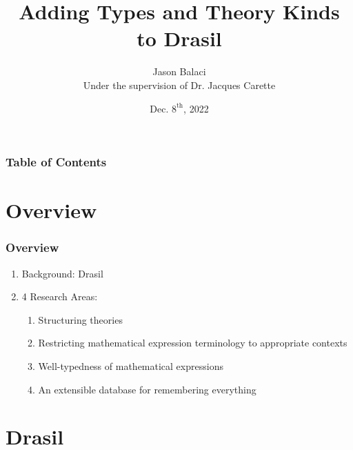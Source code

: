 \documentclass[xcolor={dvipsnames}]{beamer}
\title{Adding Types and Theory Kinds to Drasil}
\author[J. Balaci]{Jason Balaci\\\small{}Under the supervision of Dr. Jacques Carette}
\institute[McMaster U.]{McMaster University}
\date{Dec. $8^{\text{th}}$, 2022}
\begin{document}
\frame{\titlepage}


\begin{frame}
\frametitle{Table of Contents}
\tableofcontents
\end{frame}

\section{Overview}

\begin{frame}
  \frametitle{Overview}

  \begin{enumerate}
    \item Background: Drasil
    \item 4 Research Areas:
      \begin{enumerate}
        \item Structuring theories
        \item Restricting mathematical expression terminology to appropriate
              contexts
        \item Well-typedness of mathematical expressions
        \item An extensible database for remembering everything
      \end{enumerate}
  \end{enumerate}

\end{frame}

\section{Drasil}
\end{document}
